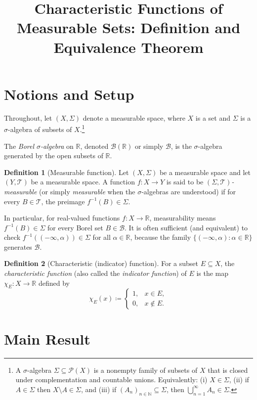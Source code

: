 \documentclass[12pt]{article}
\title{Characteristic Functions of Measurable Sets: Definition and Equivalence Theorem}
\author{}
\date{}
\theoremstyle{plain}
\theoremstyle{definition}
\newtheorem{definition}{Definition}
\newcommand{\R}{\mathbb{R}}
\newcommand{\B}{\mathcal{B}}
\newcommand{\Sig}{\Sigma}
\begin{document}
\maketitle

\section*{Notions and Setup}
Throughout, let \((X,\Sig)\) denote a measurable space, where \(X\) is a set and \(\Sig\) is a \(\sigma\)-algebra of subsets of \(X\).\footnote{A \(\sigma\)-algebra \(\Sig \subseteq \mathcal{P}(X)\) is a nonempty family of subsets of \(X\) that is closed under complementation and countable unions. Equivalently: (i) \(X \in \Sig\), (ii) if \(A \in \Sig\) then \(X \setminus A \in \Sig\), and (iii) if \((A_n)_{n\in\mathbb{N}} \subseteq \Sig\), then \(\bigcup_{n=1}^\infty A_n \in \Sig\).} 

The \emph{Borel \(\sigma\)-algebra} on \(\R\), denoted \(\B(\R)\) or simply \(\B\), is the \(\sigma\)-algebra generated by the open subsets of \(\R\).

\begin{definition}[Measurable function]
Let \((X,\Sig)\) be a measurable space and let \((Y,\mathcal{T})\) be a measurable space. A function \(f:X \to Y\) is said to be \((\Sig,\mathcal{T})\)\emph{-measurable} (or simply \emph{measurable} when the \(\sigma\)-algebras are understood) if for every \(B \in \mathcal{T}\), the preimage \(f^{-1}(B) \in \Sig\).
\end{definition}

In particular, for real-valued functions \(f:X \to \R\), measurability means \(f^{-1}(B) \in \Sig\) for every Borel set \(B \in \B\). It is often sufficient (and equivalent) to check \(f^{-1}((-\infty,\alpha)) \in \Sig\) for all \(\alpha \in \R\), because the family \(\{(-\infty,\alpha):\alpha\in\R\}\) generates \(\B\).

\begin{definition}[Characteristic (indicator) function]
For a subset \(E \subseteq X\), the \emph{characteristic function} (also called the \emph{indicator function}) of \(E\) is the map \(\chi_E:X \to \R\) defined by
\[
\chi_E(x) \coloneqq
\begin{cases}
1, & x \in E,\\
0, & x \notin E.
\end{cases}
\]
\end{definition}

\section*{Main Result}
\end{document}
